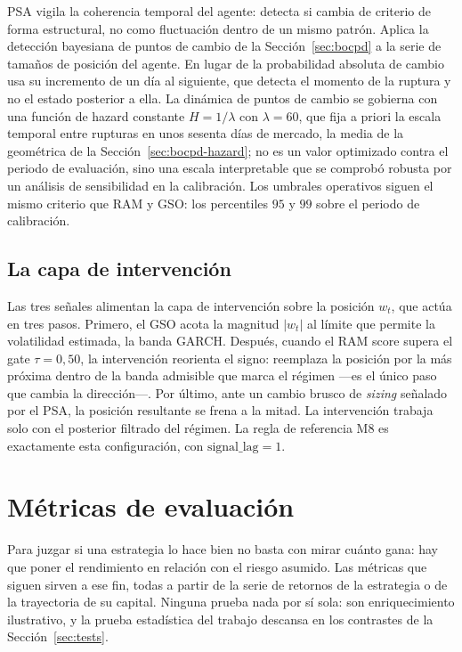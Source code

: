 PSA vigila la coherencia temporal del agente: detecta si cambia de criterio de forma estructural, no como fluctuación dentro de un mismo patrón. Aplica la detección bayesiana de puntos de cambio de la Sección~\ref{sec:bocpd} a la serie de tamaños de posición del agente. En lugar de la probabilidad absoluta de cambio usa su incremento de un día al siguiente, que detecta el momento de la ruptura y no el estado posterior a ella. La dinámica de puntos de cambio se gobierna con una función de hazard constante $H = 1/\lambda$ con $\lambda = 60$, que fija a priori la escala temporal entre rupturas en unos sesenta días de mercado, la media de la geométrica de la Sección~\ref{sec:bocpd-hazard}; no es un valor optimizado contra el periodo de evaluación, sino una escala interpretable que se comprobó robusta por un análisis de sensibilidad en la calibración. Los umbrales operativos siguen el mismo criterio que RAM y GSO: los percentiles $95$ y $99$ sobre el periodo de calibración.

\subsection{La capa de intervención}
\label{sec:strata-intervencion}

Las tres señales alimentan la capa de intervención sobre la posición $w_t$, que actúa en tres pasos. Primero, el GSO acota la magnitud $|w_t|$ al límite que permite la volatilidad estimada, la banda GARCH. Después, cuando el RAM score supera el gate $\tau = 0{,}50$, la intervención reorienta el signo: reemplaza la posición por la más próxima dentro de la banda admisible que marca el régimen —es el único paso que cambia la dirección—. Por último, ante un cambio brusco de \emph{sizing} señalado por el PSA, la posición resultante se frena a la mitad. La intervención trabaja solo con el posterior filtrado del régimen. La regla de referencia M8 es exactamente esta configuración, con $\mathrm{signal\_lag} = 1$.

\section{Métricas de evaluación}
\label{sec:metricas}

Para juzgar si una estrategia lo hace bien no basta con mirar cuánto gana: hay que poner el rendimiento en relación con el riesgo asumido. Las métricas que siguen sirven a ese fin, todas a partir de la serie de retornos de la estrategia o de la trayectoria de su capital. Ninguna prueba nada por sí sola: son enriquecimiento ilustrativo, y la prueba estadística del trabajo descansa en los contrastes de la Sección~\ref{sec:tests}.


